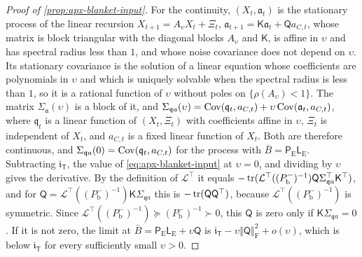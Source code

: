 \begin{proof}[Proof of \cref{prop:apx-blanket-input}]
For the continuity, $(X_t,\mathfrak a_t)$ is the stationary process of the linear recursion $X_{t+1}=A_\upsilon X_t+\Xi_t$, $\mathfrak a_{t+1}=\mathsf K\mathfrak a_t+\mathsf Qa_{C,t}$, whose matrix is block triangular with the diagonal blocks $A_\upsilon$ and $\mathsf K$, is affine in $\upsilon$ and has spectral radius less than $1$, and whose noise covariance does not depend on $\upsilon$. Its stationary covariance is the solution of a linear equation whose coefficients are polynomials in $\upsilon$ and which is uniquely solvable when the spectral radius is less than $1$, so it is a rational function of $\upsilon$ without poles on $\{\rho(A_\upsilon)<1\}$. The matrix $\Sigma_{\mathfrak a}(\upsilon)$ is a block of it, and $\Sigma_{\mathfrak qa}(\upsilon)=\operatorname{Cov}(\mathfrak q_t,a_{C,t})+\upsilon\operatorname{Cov}(\mathfrak a_t,a_{C,t})$, where $\mathfrak q_t$ is a linear function of $(X_t,\Xi_t)$ with coefficients affine in $\upsilon$, $\Xi_t$ is independent of $X_t$, and $a_{C,t}$ is a fixed linear function of $X_t$. Both are therefore continuous, and $\Sigma_{\mathfrak qa}(0)=\operatorname{Cov}(\mathfrak q_t,a_{C,t})$ for the process with $\bar B=\mathsf P_{\mathrm E}\mathsf L_{\mathrm E}$. Subtracting $\mathfrak i_{\mathsf T}$, the value of \eqref{eq:apx-blanket-input} at $\upsilon=0$, and dividing by $\upsilon$ gives the derivative. By the definition of $\mathcal L^\top$ it equals $-\operatorname{tr}(\mathcal L^\top((P^-_{\mathrm b})^{-1})\mathsf Q\Sigma_{\mathfrak qa}^\top\mathsf K^\top)$, and for $\mathsf Q=\mathcal L^\top((P^-_{\mathrm b})^{-1})\mathsf K\Sigma_{\mathfrak qa}$ this is $-\operatorname{tr}(\mathsf Q\mathsf Q^\top)$, because $\mathcal L^\top((P^-_{\mathrm b})^{-1})$ is symmetric. Since $\mathcal L^\top((P^-_{\mathrm b})^{-1})\succeq(P^-_{\mathrm b})^{-1}\succ0$, this $\mathsf Q$ is zero only if $\mathsf K\Sigma_{\mathfrak qa}=0$. If it is not zero, the limit at $\bar B=\mathsf P_{\mathrm E}\mathsf L_{\mathrm E}+\upsilon\mathsf Q$ is $\mathfrak i_{\mathsf T}-\upsilon\Vert\mathsf Q\Vert_{\mathrm F}^2+o(\upsilon)$, which is below $\mathfrak i_{\mathsf T}$ for every sufficiently small $\upsilon>0$.


\end{proof}
